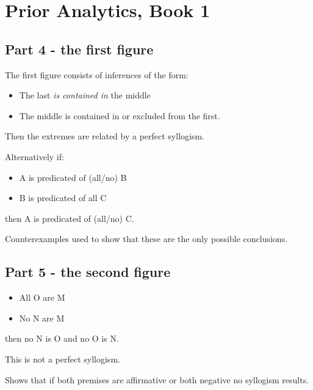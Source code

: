 \section{Prior Analytics, Book 1}

\subsection{Part 4 - the first figure}

The first figure consists of inferences of the form:

\begin{itemize}
\item The last \emph{is contained in} the middle
\item The middle is contained in or excluded from the first.
\end{itemize}

Then the extremes are related by a perfect syllogism.

Alternatively if:

\begin{itemize}
\item A is predicated of (all/no) B
\item B is predicated of all C
\end{itemize}

then A is predicated of (all/no) C.

Counterexamples used to show that these are the only possible conclusions.

\subsection{Part 5 - the second figure}

\begin{itemize}
\item All O are M
\item No N are M
\end{itemize}

then no N is O and no O is N.

This is not a perfect syllogism.

Shows that if both premises are affirmative or both negative no syllogism results.

\backmatter



